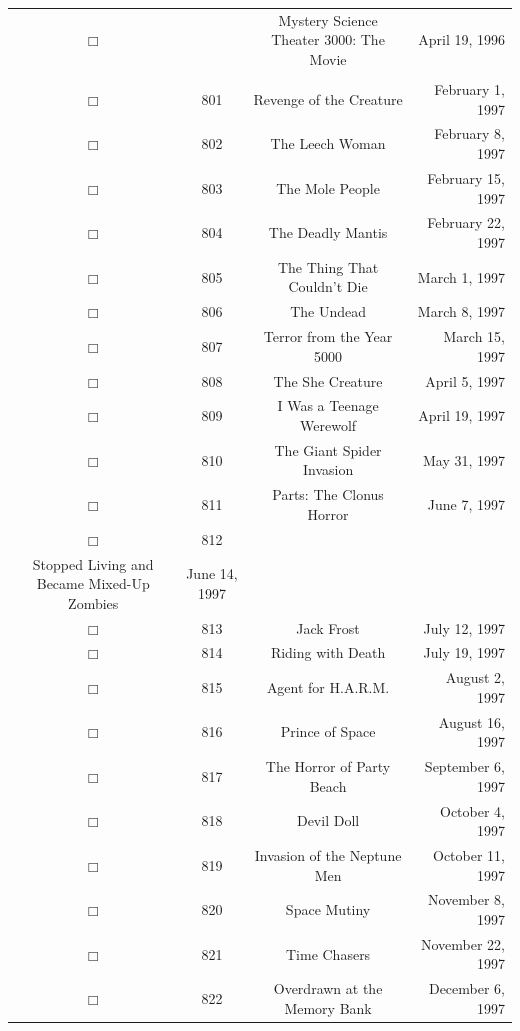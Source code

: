 \documentclass[12pt]{article}
\begin{document}
\begin{center}
\begin{longtable}[c]{cccr}
\\  %
$\Box$&&Mystery Science Theater 3000: The Movie&April 19, 1996\\

\\  %
$\Box$&801&Revenge of the Creature&February  1, 1997\\
$\Box$&802&The Leech Woman&February  8, 1997\\
$\Box$&803&The Mole People&February 15, 1997\\
$\Box$&804&The Deadly Mantis&February 22, 1997\\
$\Box$&805&The Thing That Couldn't Die&March  1, 1997\\
$\Box$&806&The Undead&March  8, 1997\\
$\Box$&807&Terror from the Year 5000&March 15, 1997\\
$\Box$&808&The She Creature&April  5, 1997\\
$\Box$&809&I Was a Teenage Werewolf&April 19, 1997\\
$\Box$&810&The Giant Spider Invasion&May 31, 1997\\
$\Box$&811&Parts: The Clonus Horror&June  7, 1997\\
$\Box$&812&\begin{tabular}{@{}c@{}}The Incredibly Strange Creatures Who\\Stopped Living and Became Mixed-Up Zombies\end{tabular}&June 14, 1997\\
$\Box$&813&Jack Frost&July 12, 1997\\
$\Box$&814&Riding with Death&July 19, 1997\\
$\Box$&815&Agent for H.A.R.M.&August  2, 1997\\
$\Box$&816&Prince of Space&August 16, 1997\\
$\Box$&817&The Horror of Party Beach&September  6, 1997\\
$\Box$&818&Devil Doll&October  4, 1997\\
$\Box$&819&Invasion of the Neptune Men&October 11, 1997\\
$\Box$&820&Space Mutiny&November  8, 1997\\
$\Box$&821&Time Chasers&November 22, 1997\\
$\Box$&822&Overdrawn at the Memory Bank&December  6, 1997\\  %


\end{longtable}
\end{center}
\end{document}
